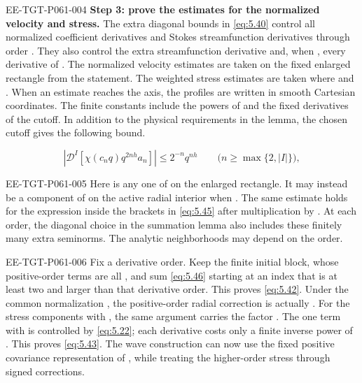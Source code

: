 \begin{EESegment}{EE-TGT-P061-004}
\textbf{Step 3: prove the estimates for the normalized velocity and stress.} The extra diagonal bounds in \eqref{eq:5.40} control all normalized coefficient derivatives and Stokes streamfunction derivatives through order . They also control the extra streamfunction derivative and, when , every derivative of . The normalized velocity estimates are taken on the fixed enlarged rectangle from the statement. The weighted stress estimates are taken where  and . When an estimate reaches the axis, the profiles are written in smooth Cartesian coordinates. The finite constants include the powers of  and the fixed derivatives of the cutoff. In addition to the physical requirements in the lemma, the chosen cutoff gives the following bound.
\end{EESegment}
\begin{equation}
 \left|\mathscr D^I\!\left[\chi(c_nq)q^{2nh}a_n\right]\right|
 \le 2^{-n}q^{nh}
 \qquad \bigl(n\ge\max\{2,|I|\}\bigr),
 \tag{5.46}\label{eq:5.46}
\end{equation}
\begin{EESegment}{EE-TGT-P061-005}
Here  is any one of  on the enlarged rectangle. It may instead be a component of  on the active radial interior when . The same estimate holds for the expression inside the brackets in \eqref{eq:5.45} after multiplication by . At each order, the diagonal choice in the summation lemma also includes these finitely many extra seminorms. The analytic neighborhoods may depend on the order.
\end{EESegment}

\begin{EESegment}{EE-TGT-P061-006}
Fix a derivative order. Keep the finite initial block, whose positive-order terms are all , and sum \eqref{eq:5.46} starting at an index that is at least two and larger than that derivative order. This proves \eqref{eq:5.42}. Under the common normalization , the positive-order radial correction is actually . For the stress components with , the same argument carries the factor . The one term with  is controlled by \eqref{eq:5.22}; each derivative costs only a finite inverse power of . This proves \eqref{eq:5.43}. The wave construction can now use the fixed positive covariance representation of , while treating the higher-order stress through signed corrections.
\end{EESegment}

